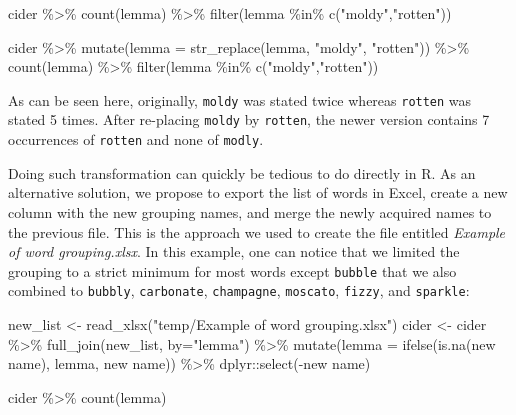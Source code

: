 \documentclass[
]{book}
\newenvironment{Shaded}{\begin{snugshade}}{\end{snugshade}}
\newcommand{\AttributeTok}[1]{\textcolor[rgb]{0.77,0.63,0.00}{#1}}
\newcommand{\FunctionTok}[1]{\textcolor[rgb]{0.00,0.00,0.00}{#1}}
\newcommand{\NormalTok}[1]{#1}
\newcommand{\OtherTok}[1]{\textcolor[rgb]{0.56,0.35,0.01}{#1}}
\newcommand{\SpecialCharTok}[1]{\textcolor[rgb]{0.00,0.00,0.00}{#1}}
\newcommand{\StringTok}[1]{\textcolor[rgb]{0.31,0.60,0.02}{#1}}
\begin{document}
\begin{Shaded}
\begin{Highlighting}[]
\NormalTok{cider }\SpecialCharTok{\%\textgreater{}\%} 
  \FunctionTok{count}\NormalTok{(lemma) }\SpecialCharTok{\%\textgreater{}\%} 
  \FunctionTok{filter}\NormalTok{(lemma }\SpecialCharTok{\%in\%} \FunctionTok{c}\NormalTok{(}\StringTok{"moldy"}\NormalTok{,}\StringTok{"rotten"}\NormalTok{))}

\NormalTok{cider }\SpecialCharTok{\%\textgreater{}\%} 
  \FunctionTok{mutate}\NormalTok{(}\AttributeTok{lemma =} \FunctionTok{str\_replace}\NormalTok{(lemma, }\StringTok{"moldy"}\NormalTok{, }\StringTok{"rotten"}\NormalTok{)) }\SpecialCharTok{\%\textgreater{}\%} 
  \FunctionTok{count}\NormalTok{(lemma) }\SpecialCharTok{\%\textgreater{}\%} 
  \FunctionTok{filter}\NormalTok{(lemma }\SpecialCharTok{\%in\%} \FunctionTok{c}\NormalTok{(}\StringTok{"moldy"}\NormalTok{,}\StringTok{"rotten"}\NormalTok{))}
\end{Highlighting}
\end{Shaded}

As can be seen here, originally, \texttt{moldy} was stated twice whereas \texttt{rotten} was stated 5 times. After re-placing \texttt{moldy} by \texttt{rotten}, the newer version contains 7 occurrences of \texttt{rotten} and none of \texttt{modly}.

Doing such transformation can quickly be tedious to do directly in R. As an alternative solution, we propose to export the list of words in Excel, create a new column with the new grouping names, and merge the newly acquired names to the previous file. This is the approach we used to create the file entitled \emph{Example of word grouping.xlsx}. In this example, one can notice that we limited the grouping to a strict minimum for most words except \texttt{bubble} that we also combined to \texttt{bubbly}, \texttt{carbonate}, \texttt{champagne}, \texttt{moscato}, \texttt{fizzy}, and \texttt{sparkle}:

\begin{Shaded}
\begin{Highlighting}[]
\NormalTok{new\_list }\OtherTok{\textless{}{-}} \FunctionTok{read\_xlsx}\NormalTok{(}\StringTok{"temp/Example of word grouping.xlsx"}\NormalTok{)}
\NormalTok{cider }\OtherTok{\textless{}{-}}\NormalTok{ cider }\SpecialCharTok{\%\textgreater{}\%} 
  \FunctionTok{full\_join}\NormalTok{(new\_list, }\AttributeTok{by=}\StringTok{"lemma"}\NormalTok{) }\SpecialCharTok{\%\textgreater{}\%} 
  \FunctionTok{mutate}\NormalTok{(}\AttributeTok{lemma =} \FunctionTok{ifelse}\NormalTok{(}\FunctionTok{is.na}\NormalTok{(}\StringTok{\textasciigrave{}}\AttributeTok{new name}\StringTok{\textasciigrave{}}\NormalTok{), lemma, }\StringTok{\textasciigrave{}}\AttributeTok{new name}\StringTok{\textasciigrave{}}\NormalTok{)) }\SpecialCharTok{\%\textgreater{}\%} 
\NormalTok{  dplyr}\SpecialCharTok{::}\FunctionTok{select}\NormalTok{(}\SpecialCharTok{{-}}\StringTok{\textasciigrave{}}\AttributeTok{new name}\StringTok{\textasciigrave{}}\NormalTok{)}

\NormalTok{cider }\SpecialCharTok{\%\textgreater{}\%} \FunctionTok{count}\NormalTok{(lemma)}
\end{Highlighting}
\end{Shaded}
\end{document}
